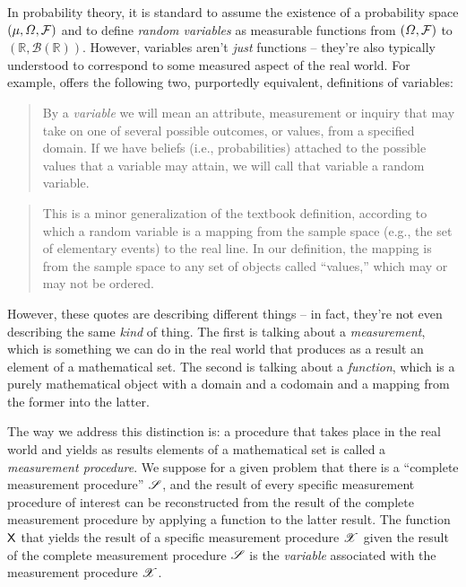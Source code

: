In probability theory, it is standard to assume the existence of a probability space $(\mu,\Omega,\mathcal{F})$ and to define \emph{random variables} as measurable functions from $(\Omega,\mathcal{F})$ to $(\mathbb{R},\mathcal{B}(\mathbb{R}))$. However, variables aren't \emph{just} functions -- they're also typically understood to correspond to some measured aspect of the real world. For example, \citet{pearl_causality:_2009} offers the following two, purportedly equivalent, definitions of variables:
\begin{quote}
By a \emph{variable} we will mean an attribute, measurement or inquiry that may take on one of several possible outcomes, or values, from a specified domain. If we have beliefs (i.e., probabilities) attached to the possible values that a variable may attain, we will call that variable a random variable.
\end{quote}

\begin{quote}
This is a minor generalization of the textbook definition, according to which a random variable is a mapping from the sample space (e.g., the set of elementary events) to the real line. In our definition, the mapping is from the sample space to any set of objects called ``values,'' which may or may not be ordered.
\end{quote}

However, these quotes are describing different things -- in fact, they're not even describing the same \emph{kind} of thing. The first is talking about a \emph{measurement}, which is something we can do in the real world that produces as a result an element of a mathematical set. The second is talking about a \emph{function}, which is a purely mathematical object with a domain and a codomain and a mapping from the former into the latter.

The way we address this distinction is: a procedure that takes place in the real world and yields as results elements of a mathematical set is called a \emph{measurement procedure}. We suppose for a given problem that there is a ``complete measurement procedure'' $\mathscr{S}$, and the result of every specific measurement procedure of interest can be reconstructed from the result of the complete measurement procedure by applying a function to the latter result. The function $\mathsf{X}$ that yields the result of a specific measurement procedure $\mathscr{X}$ given the result of the complete measurement procedure $\mathscr{S}$ is the \emph{variable} associated with the measurement procedure $\mathscr{X}$.

